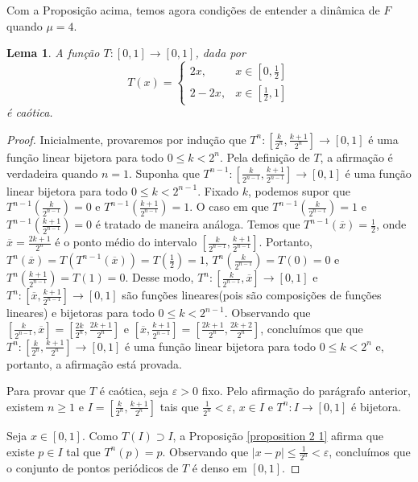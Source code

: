 \documentclass[a4paper, 12pt]{article}
\theoremstyle{definition}
\theoremstyle{plain}
\theoremstyle{plain}
\newtheorem{lemma}[definition]{Lema}
\theoremstyle{plain}
\theoremstyle{definition}
\theoremstyle{remark}
\begin{document}
Com a Proposição acima, temos agora condições de entender a dinâmica de $F$ quando $\mu = 4$.

\begin{lemma}
\label{lemma 5 1}
A função $T: [0,1] \to [0,1]$, dada por
\[
T(x) = 
  \begin{cases}
      2x, & x \in [0, \frac{1}{2}] \\
      2 - 2x, & x \in [\frac{1}{2}, 1] 
  \end{cases}
\]
é caótica.
\end{lemma}

\begin{proof}
Inicialmente, provaremos por indução que $T^n: [\frac{k}{2^n}, \frac{k+1}{2^n}] \to [0,1]$ é uma função linear bijetora para todo $0 \leq k  < 2^n$. Pela definição de $T$, a afirmação é verdadeira quando $n = 1$. Suponha que $T^{n-1}: [\frac{k}{2^{n-1}}, \frac{k+1}{2^{n-1}}] \to [0,1]$ é uma função linear bijetora para todo $0 \leq k < 2^{n-1}$. Fixado $k$, podemos supor que $T^{n-1}(\frac{k}{2^{n-1}}) = 0$ e $T^{n-1}(\frac{k+1}{2^{n-1}}) = 1$. O caso em que $T^{n-1}(\frac{k}{2^{n-1}}) = 1$ e $T^{n-1}(\frac{k+1}{2^{n-1}}) = 0$ é tratado de maneira análoga. Temos que $T^{n-1}(\overline{x}) = \frac{1}{2}$, onde $\overline{x} = \frac{2k+1}{2^n}$ é o ponto médio do intervalo $[\frac{k}{2^{n-1}}, \frac{k+1}{2^{n-1}}]$. Portanto, $T^n(\overline{x}) = T(T^{n-1}(\overline{x})) = T(\frac{1}{2}) = 1$, $T^n(\frac{k}{2^{n-1}}) = T(0) = 0$ e $T^n(\frac{k+1}{2^{n-1}}) = T(1) = 0$. Desse modo, $T^n: [\frac{k}{2^{n-1}}, \overline{x}] \to [0,1]$ e $T^n: [\overline{x}, \frac{k+1}{2^{n-1}}] \to [0,1]$ são funções lineares(pois são composições de funções lineares) e bijetoras para todo $0 \leq k < 2^{n-1}$. Observando que $[\frac{k}{2^{n-1}}, \overline{x}] =  [\frac{2k}{2^n}, \frac{2k+1}{2^n}]$ e $[\overline{x}, \frac{k+1}{2^{n-1}}] =  [\frac{2k+1}{2^n}, \frac{2k+2}{2^n}]$, concluímos que  que $T^n: [\frac{k}{2^n}, \frac{k+1}{2^n}] \to [0,1]$ é uma função linear bijetora para todo $0 \leq k  < 2^n$ e, portanto, a afirmação está provada.

Para provar que $T$ é caótica, seja $\varepsilon > 0$ fixo. Pelo afirmação do parágrafo anterior, existem $n \geq 1$ e $I = [\frac{k}{2^n}, \frac{k+1}{2^n}]$  tais que $\frac{1}{2^n} < \varepsilon$, $x \in I$ e $T^n: I \to [0,1]$ é bijetora.

Seja $x \in [0,1]$. Como $T(I) \supset I$, a Proposição \ref{proposition 2 1} afirma que existe $p \in I$ tal que $T^n(p) = p$. Observando que $|x-p| \leq \frac{1}{2^n} < \varepsilon$, concluímos que o conjunto de pontos periódicos de $T$ é denso em $[0,1]$.


\end{proof}
\end{document}
